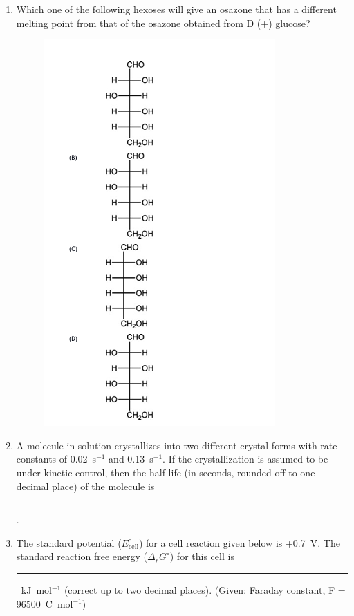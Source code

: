 \documentclass[journal,12pt,onecolumn]{IEEEtran}
\begin{document}
\begin{enumerate}[label=\arabic*., start=6]
\item Which one of the following hexoses will give an osazone that has a different melting point from that of the osazone obtained from D (+) glucose?
\begin{figure}[H]
\centering
\includegraphics[width=0.7\columnwidth]{FIG/P-11.png}
\caption*{}
\label{P-11}
\end{figure}

\item A molecule in solution crystallizes into two different crystal forms with rate constants of 0.02~s$^{-1}$ and 0.13~s$^{-1}$. If the crystallization is assumed to be under kinetic control, then the half-life (in seconds, rounded off to one decimal place) of the molecule is \rule{3cm}{0.1pt}.


\item The standard potential ($E_\text{cell}^\circ$) for a cell reaction given below is +0.7~V. The standard reaction free energy ($\Delta_r G^\circ$) for this cell is \rule{3cm}{0.1pt}~kJ~mol$^{-1}$ (correct up to two decimal places). (Given: Faraday constant, F = 96500~C~mol$^{-1}$)\\



\end{enumerate}
\end{document}
